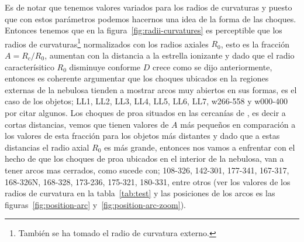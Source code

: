 Es de notar que tenemos valores variados para los radios de curvaturas y puesto que con estos parámetros podemos hacernos una idea de la forma de las choques. Entonces tenemos que en la figura~\ref{fig:radii-curvatures} es perceptible que los radios de curvaturas\footnote{También se ha tomado el radio de curvatura externo.} normalizados con los radios axiales \(R_{0}\), esto es la fracción \(A=R_{c}/R_{0}\), aumentan con la distancia a la estrella ionizante y dado que el radio caracterísitico \(R_{0}\) disminuye conforme \(D\) crece como se dijo anteriormente, entonces es coherente argumentar que los choques ubicados en la regiones externas de la nebulosa tienden a mostrar arcos muy abiertos en sus formas, es el caso de los objetos; LL1, LL2, LL3, LL4, LL5, LL6, LL7, w266-558 y w000-400 por citar algunos. Los choques de proa situados en las cercanías de \thC{}, es decir a cortas distancias, vemos que tienen valores de \(A\) más pequeños en comparación a los valores de esta fracción para los objetos más distantes y dado que a estas distancias el radio axial \(R_{0}\) es más grande, entonces nos vamos a enfrentar con el hecho de que los choques de proa ubicados en el interior de la nebulosa, van a tener arcos mas cerrados, como sucede con; 108-326, 142-301, 177-341, 167-317, 168-326N, 168-328, 173-236, 175-321, 180-331, entre otros (ver los valores de los radios de curvatura en la tabla~\ref{tab:test}  y las posiciones de los arcos es las figuras~\ref{fig:position-arc} y~\ref{fig:position-arc-zoom}).\\  

